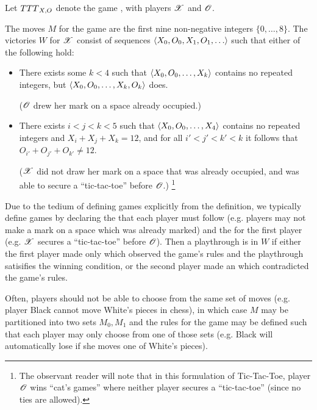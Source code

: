 \begin{game}
  Let ${TTT}_{X,O}$ denote the game , with players $\mathscr{X}$ 
  and $\mathscr{O}$.

  The moves $M$ for the game are the first nine non-negative 
  integers $\{0,\dots,8\}$. The victories $W$ for $\mathscr{X}$ 
  consist of sequences $\<X_0,O_0,X_1,O_1,\dots\>$ such that either of the 
  following hold:
    \begin{itemize}
      \item There exists some $k<4$ such that $\langle X_0,O_0,\dots,X_k\rangle$ contains
            no repeated integers, but $\langle X_0,O_0,\dots,X_k,O_k\rangle$ does.

            ($\mathscr{O}$ drew her mark on a space already occupied.)
      \item There exists $i<j<k<5$ such that $\langle X_0,O_0,\dots,X_4\rangle$ contains 
            no repeated integers and $X_i+X_j+X_k=12$, and for all
            $i'<j'<k'<k$ it follows that $O_{i'}+O_{j'}+O_{k'}\not=12$.

            ($\mathscr{X}$ did not draw her mark on a space that was already occupied,
            and was able to secure a ``tic-tac-toe'' before $\mathscr{O}$.)
            \footnote{
              The observant reader will note that in this formulation of 
              Tic-Tac-Toe, player $\mathscr{O}$ wins ``cat's games'' where neither 
              player secures a ``tic-tac-toe'' (since no ties are allowed).
            }
    \end{itemize}
\end{game}

Due to the tedium of defining games explicitly from the definition, we 
typically define games by declaring the  that each player must 
follow (e.g. players may not make a mark on a space which was already marked)
and the  for the first player (e.g. $\mathscr{X}$ secures
a ``tic-tac-toe'' before $\mathscr{O}$). Then a playthrough is in $W$ if either 
the first player made only  which observed the game's rules
and the playthrough satisifies the winning condition, or the second player
made an  which contradicted the game's rules.

Often, players should not be able to choose from the same set of moves
(e.g. player Black cannot move White's pieces in chess), in which case $M$ may
be partitioned into two sets $M_0,M_1$ and the rules for the game may be defined
such that each player may only choose from one of those sets 
(e.g. Black will automatically lose if she moves one of White's pieces).

